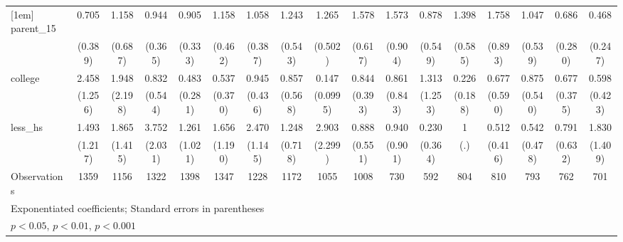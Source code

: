 {\begin{tabular}{l*{16}{c}}
[1em]
parent\_15           &       0.705         &       1.158         &       0.944         &       0.905         &       1.158         &       1.058         &       1.243         &       1.265         &       1.578         &       1.573         &       0.878         &       1.398         &       1.758         &       1.047         &       0.686         &       0.468         \\
                    &     (0.389)         &     (0.687)         &     (0.365)         &     (0.333)         &     (0.462)         &     (0.387)         &     (0.543)         &     (0.502)         &     (0.617)         &     (0.904)         &     (0.549)         &     (0.585)         &     (0.893)         &     (0.539)         &     (0.280)         &     (0.247)         \\
[1em]
college             &       2.458         &       1.948         &       0.832         &       0.483         &       0.537         &       0.945         &       0.857         &       0.147\sym{**} &       0.844         &       0.861         &       1.313         &       0.226         &       0.677         &       0.875         &       0.677         &       0.598         \\
                    &     (1.256)         &     (2.198)         &     (0.544)         &     (0.281)         &     (0.370)         &     (0.436)         &     (0.568)         &    (0.0995)         &     (0.393)         &     (0.843)         &     (1.253)         &     (0.188)         &     (0.590)         &     (0.540)         &     (0.375)         &     (0.423)         \\
[1em]
less\_hs             &       1.493         &       1.865         &       3.752\sym{*}  &       1.261         &       1.656         &       2.470         &       1.248         &       2.903         &       0.888         &       0.940         &       0.230         &           1         &       0.512         &       0.542         &       0.791         &       1.830         \\
                    &     (1.217)         &     (1.415)         &     (2.031)         &     (1.021)         &     (1.190)         &     (1.145)         &     (0.718)         &     (2.299)         &     (0.551)         &     (0.901)         &     (0.364)         &         (.)         &     (0.416)         &     (0.478)         &     (0.632)         &     (1.409)         \\
\hline
Observations        &        1359         &        1156         &        1322         &        1398         &        1347         &        1228         &        1172         &        1055         &        1008         &         730         &         592         &         804         &         810         &         793         &         762         &         701         \\
\hline\hline
\multicolumn{17}{l}{\footnotesize Exponentiated coefficients; Standard errors in parentheses}\\
\multicolumn{17}{l}{\footnotesize \sym{*} \(p<0.05\), \sym{**} \(p<0.01\), \sym{***} \(p<0.001\)}\\
\end{tabular}
}
